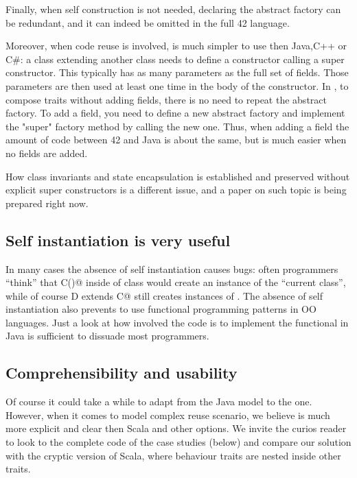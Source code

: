 Finally, when self construction is not needed, declaring the abstract factory can be redundant, and it can indeed be omitted in the full 42 language.

Moreover, when code reuse is involved, \name is much simpler to use then Java,C++ or C\#: a class extending another class needs to define a constructor calling a super constructor.
   This typically has as many parameters as the full set of fields. Those parameters are then used at least one time in the body of the constructor.
In \name, to compose traits without adding fields, there is no need to repeat the abstract factory.
To add a field, you need to define a new abstract factory and implement the "super" factory method by calling the new one.
Thus, when adding a field the amount of code between 42 and Java is about the same, but is much easier when no fields are added.

How class invariants and state encapsulation is established and preserved without explicit super constructors is a different issue, and a paper on such topic is being prepared right now.

\subsection{Self instantiation is very useful}
In many cases the absence of self instantiation causes bugs: often programmers ``think'' that \Q@new C()@ inside of class \Q@C@ would create an instance of the ``current class'', while of course \Q@class D extends C@ still creates instances of \Q@C@.
The absence of self instantiation also prevents to use functional programming patterns in OO languages.
Just a look at how involved the code is to implement the functional \Q@Point@ in Java is sufficient to dissuade most programmers.

\subsection{Comprehensibility and usability}
Of course it could take a while to adapt from the Java model to the \name one. However, when it comes to model complex reuse scenario, we believe \name is much more explicit and clear then Scala and other options. We invite the curios reader to look to the complete code of the case studies (below) and compare our solution with the cryptic version of Scala, where behaviour traits are nested inside other traits.

